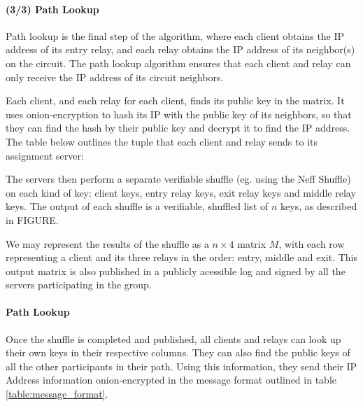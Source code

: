 \paragraph{(3/3) Path Lookup}
Path lookup is the final step of the algorithm, where each client obtains the
IP address of its entry relay, and each relay obtains the IP address of its
neighbor(s) on the circuit. The path lookup algorithm ensures that each client
and relay can only receive the IP address of its circuit neighbors.

Each client, and each relay for each client, finds its public key in the matrix.
It uses onion-encryption to hash its IP with the public key of its neighbors,
so that they can find the hash by their public key and decrypt it to find the IP address. The table below outlines the tuple that each client and relay sends to
its assignment server:

The servers then perform a separate verifiable shuffle (eg. using the Neff
Shuffle\cite{neff2001verifiable}) on each kind of key: client keys, entry relay
keys, exit relay keys and middle relay keys. The output of each shuffle is a
verifiable, shuffled list of $n$ keys, as described in FIGURE. 

We may represent the results of the shuffle as a $n \times 4$ matrix $M$, with
each row representing a client and its three relays in the order: entry, middle
and exit. This output matrix is also published in a publicly acessible log and
signed by all the servers participating in the group.

\paragraph{Path Lookup}
Once the shuffle is completed and published, all clients and relays can look up
their own keys in their respective columns. They can also find the public keys 
of all the other participants in their path. Using this information, they send 
their IP Address information onion-encrypted in the message format outlined in
table \ref{table:message_format}.

